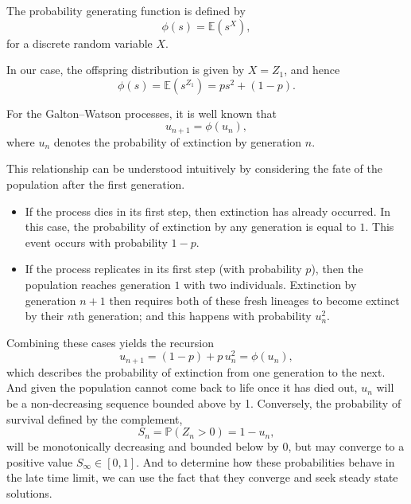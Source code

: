 \vspace{12pt}


\noindent
The probability generating function is defined by
\[
\phi(s) = \mathbb{E}(s^{X}),
\]
for a discrete random variable $X$.

In our case, the offspring distribution is given by $X = Z_1$, and hence
\[
\phi(s) = \mathbb{E}(s^{Z_1}) = p s^2 + (1-p).
\]


\noindent
For the Galton--Watson processes, it is well known that
\[
u_{n+1} = \phi(u_n),
\]
where $u_n$ denotes the probability of extinction by generation $n$.

This relationship can be understood intuitively by considering the fate of the
population after the first generation.

\begin{itemize}
    \item If the process dies in its first step, then extinction has already
    occurred. In this case, the probability of extinction by any generation is
    equal to $1$. This event occurs with probability $1-p$.
    \item If the process replicates in its first step (with probability $p$), then the population
    reaches generation $1$ with two individuals. Extinction by generation $n+1$
    then requires both of these fresh lineages to become extinct by their $n$th generation; and this happens with probability $u_n^2$.
\end{itemize}

\noindent
Combining these cases yields the recursion
\begin{equation}
u_{n+1} = (1-p) + p\, u_n^2 = \phi(u_n),
\label{eq:unrec}
\end{equation}
which describes the probability of extinction from one generation to the next. And given the population cannot come
back to life once it has died out, $u_n$ will be a non-decreasing sequence bounded above by 1. Conversely, the probability of survival
defined by the complement, $$ S_n = \mathbb{P}(Z_n > 0)  = 1-u_n,$$ will be monotonically decreasing and bounded below by 0, but may converge to a positive value $S_\infty \in [0,1]$.
And to determine how these probabilities behave in the late time limit, we can use the fact that they converge and seek steady state solutions.



